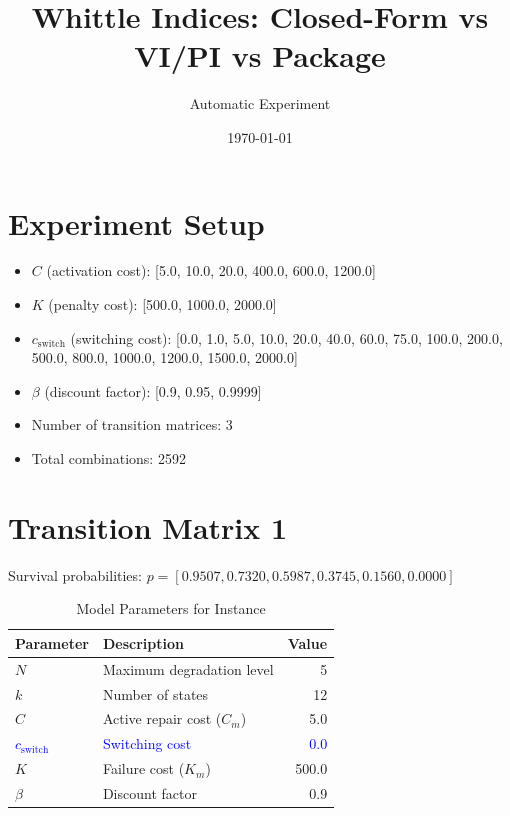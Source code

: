 \documentclass{article}
\newcounter{instance}
\newcommand{\theinstance}{\arabic{instance}}
\begin{document}
\title{Whittle Indices: Closed-Form vs VI/PI vs Package}
\author{Automatic Experiment}
\date{\today}
\maketitle

\section*{Experiment Setup}
\begin{itemize}
\item $C$ (activation cost): [5.0, 10.0, 20.0, 400.0, 600.0, 1200.0]
\item $K$ (penalty cost): [500.0, 1000.0, 2000.0]
\item $c_{\text{switch}}$ (switching cost): [0.0, 1.0, 5.0, 10.0, 20.0, 40.0, 60.0, 75.0, 100.0, 200.0, 500.0, 800.0, 1000.0, 1200.0, 1500.0, 2000.0]
\item $\beta$ (discount factor): [0.9, 0.95, 0.9999]
\item Number of transition matrices: 3
\item Total combinations: 2592
\end{itemize}

\section{Transition Matrix 1}
Survival probabilities: $p = [0.9507, 0.7320, 0.5987, 0.3745, 0.1560, 0.0000]$

\begin{table}[h!]
\centering
\caption{Model Parameters for Instance \theinstance}
\begin{tabular}{@{}llr@{}}
\toprule
\textbf{Parameter} & \textbf{Description} & \textbf{Value} \\
\midrule
$N$ & Maximum degradation level & 5 \\
$k$ & Number of states & 12 \\
$C$ & Active repair cost ($C_m$) & 5.0 \\
\textcolor{blue}{$c_{\text{switch}}$} & \textcolor{blue}{Switching cost} & \textcolor{blue}{0.0} \\
$K$ & Failure cost ($K_m$) & 500.0 \\
$\beta$ & Discount factor & 0.9 \\
\bottomrule
\end{tabular}
\end{table}
\end{document}
